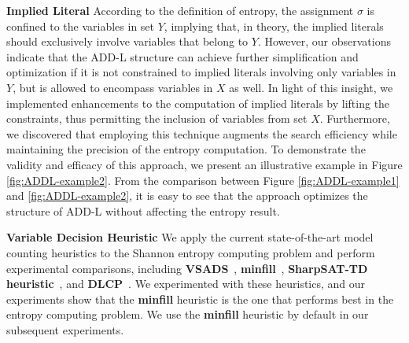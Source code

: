 \textbf{Implied Literal}
According to the definition of entropy, the assignment $\sigma$ is confined to the variables in set $Y$, implying that, in theory, the implied literals should exclusively involve variables that belong to $Y$.
However, our observations indicate that the ADD-L structure can achieve further simplification and optimization if it is not constrained to implied literals involving only variables in $Y$, but is allowed to encompass variables in $X$ as well.
In light of this insight, we implemented enhancements to the computation of implied literals by lifting the constraints, thus permitting the inclusion of variables from set $X$.
Furthermore, we discovered that employing this technique augments the search efficiency while maintaining the precision of the entropy computation.
To demonstrate the validity and efficacy of this approach, we present an illustrative example in Figure \ref{fig:ADDL-example2}.
From the comparison between Figure \ref{fig:ADDL-example1} and \ref{fig:ADDL-example2}, it is easy to see that the approach optimizes the structure of ADD-L without affecting the entropy result.

\textbf{Variable Decision Heuristic} 
We apply the current state-of-the-art model counting heuristics to the Shannon entropy computing problem and perform experimental comparisons, including \textbf{VSADS}~\cite{sang2005heuristics}, \textbf{minfill}~\cite{darwiche2009modeling}, \textbf{SharpSAT-TD heuristic}~\cite{korhonen2021integrating}, and \textbf{DLCP}~\cite{lai2021power}.
We experimented with these heuristics, and our experiments show that the \textbf{minfill} heuristic is the one that performs best in the entropy computing problem. 
We use the \textbf{minfill} heuristic by default in our subsequent experiments.

